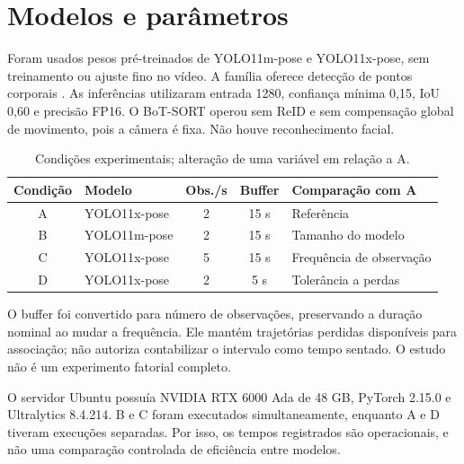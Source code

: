 \documentclass[12pt,a4paper,twoside,openany,chapter=TITLE,subsection=TITLE,section=TITLE,subsubsection=TITLE,english,brazil]{abntex2}
\newcommand{\fontedados}[1]{\par\vspace{3pt}{\footnotesize Fonte: #1.}\par}
\begin{document}
\section{Modelos e parâmetros}
Foram usados pesos pré-treinados de YOLO11m-pose e YOLO11x-pose, sem treinamento ou ajuste fino no vídeo. A família oferece detecção de pontos corporais \cite{ultralytics11}. As inferências utilizaram entrada 1280, confiança mínima 0,15, IoU 0,60 e precisão FP16. O BoT-SORT operou sem ReID e sem compensação global de movimento, pois a câmera é fixa. Não houve reconhecimento facial.

\begin{table}[H]
\centering
\caption{Condições experimentais; alteração de uma variável em relação a A.}
\label{tab:configs}
\begin{tabular}{clccp{4.8cm}}
\toprule
Condição & Modelo & Obs./s & Buffer & Comparação com A\\
\midrule
A & YOLO11x-pose & 2 & 15 s & Referência\\
B & YOLO11m-pose & 2 & 15 s & Tamanho do modelo\\
C & YOLO11x-pose & 5 & 15 s & Frequência de observação\\
D & YOLO11x-pose & 2 & 5 s & Tolerância a perdas\\
\bottomrule
\end{tabular}
\fontedados{configurações efetivamente executadas}
\end{table}
O buffer foi convertido para número de observações, preservando a duração nominal ao mudar a frequência. Ele mantém trajetórias perdidas disponíveis para associação; não autoriza contabilizar o intervalo como tempo sentado. O estudo não é um experimento fatorial completo.

O servidor Ubuntu possuía NVIDIA RTX 6000 Ada de 48 GB, PyTorch 2.15.0 e Ultralytics 8.4.214. B e C foram executados simultaneamente, enquanto A e D tiveram execuções separadas. Por isso, os tempos registrados são operacionais, e não uma comparação controlada de eficiência entre modelos.

\clearpage
\end{document}
